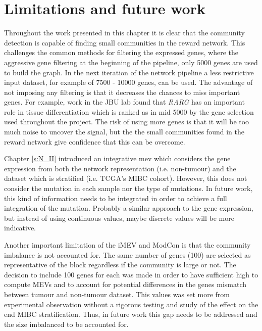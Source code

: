 \newpage 


\section{Limitations and future work }

Throughout the work presented in this chapter it is clear that the community detection is capable of finding small communities in the reward network. This challenges the common methods for filtering the expressed genes, where  the aggressive gene filtering at the beginning of the pipeline, only 5000 genes are used to build the graph. In the next iteration of the network pipeline a less restrictive input dataset, for example of 7500 - 10000 genes, can be used. The advantage of not imposing any filtering is that it decreases the chances to miss important genes. For example, work in the JBU lab found that \textit{RARG} has an important role in tissue differentiation which is ranked as in mid 5000 by the gene selection used throughout the project. The risk of using more genes is that it will be too much noise to uncover the signal, but the the small communities found in the reward network give confidence that this can be overcome.

Chapter \cref{s:N_II} introduced an integrative \acrfull{mev} which considers the gene expression from both the network representation (i.e. non-tumour) and the dataset which is stratified (i.e. TCGA's MIBC cohort). However, this does not consider the mutation in each sample nor the type of mutations. In future work, this kind of information needs to be integrated in order to achieve a full integration of the mutation. Probably a similar approach to the gene expression, but instead of using continuous values, maybe discrete values will be more indicative.

Another important limitation of the iMEV and ModCon is that the community imbalance is not accounted for. The same number of genes (100) are selected as representative of the block regardless if the community is large or not. The decision to include 100 genes for each was made in order to have sufficient high to compute MEVs and to account for potential differences in the genes mismatch between tumour and non-tumour dataset. This values was set more from experimental observation without a rigorous testing and study of the effect on the end MIBC stratification. Thus, in future work this gap needs to be addressed and the size imbalanced to be accounted for.


